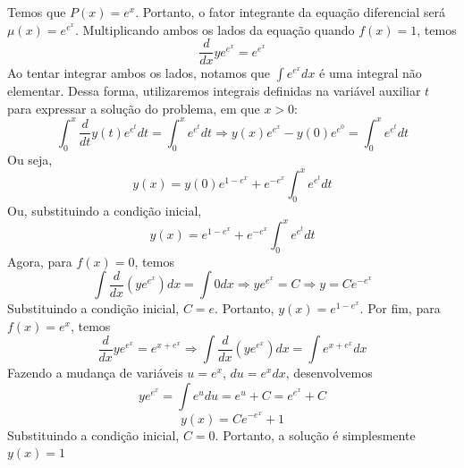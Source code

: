 \documentclass[oneside,12pt,a4paper]{report}
\begin{document}
    \begin{resolucao}
        Temos que $P(x)=e^x$. Portanto, o fator integrante da equação diferencial será $\mu(x)=e^{e^x}$. Multiplicando ambos os lados da equação quando $f(x)=1$, temos
        \[\frac{d}{dx}ye^{e^x}=e^{e^x}\]
        Ao tentar integrar ambos os lados, notamos que $\int e^{e^x}dx$ é uma integral não elementar. Dessa forma, utilizaremos integrais definidas na variável auxiliar $t$ para expressar a solução do problema, em que $x>0$:
        \[\int_{0}^{x}\frac{d}{dt}y(t)e^{e^t}dt=\int_{0}^{x}e^{e^t}dt\Rightarrow y(x)e^{e^x}-y(0)e^{e^0}=\int_{0}^{x}e^{e^t}dt\]
        Ou seja,
        \[y(x)=y(0)e^{1-e^x}+e^{-e^x}\int_{0}^{x}e^{e^t}dt\]
        Ou, substituindo a condição inicial,
        \[\boxed{y(x)=e^{1-e^x}+e^{-e^x}\int_{0}^{x}e^{e^t}dt}\]
        Agora, para $f(x)=0$, temos
        \[\int\frac{d}{dx}(ye^{e^x})dx=\int 0dx\Rightarrow ye^{e^x}=C\Rightarrow y=Ce^{-e^x}\]
        Substituindo a condição inicial, $C=e$. Portanto, $\boxed{y(x)=e^{1-e^x}}$.
        Por fim, para $f(x)=e^x$, temos
        \[\frac{d}{dx}ye^{e^x}=e^{x+e^x}\Rightarrow\int\frac{d}{dx}(ye^{e^x})dx=\int e^{x+e^x}dx\]
        Fazendo a mudança de variáveis $u=e^x$, $du=e^xdx$, desenvolvemos
        \[ye^{e^x}=\int e^udu=e^u+C=e^{e^x}+C\]
        \[y(x)=Ce^{-e^x}+1\]
        Substituindo a condição inicial, $C=0$. Portanto, a solução é simplesmente $\boxed{y(x)=1}$
    \end{resolucao}
\end{document}
